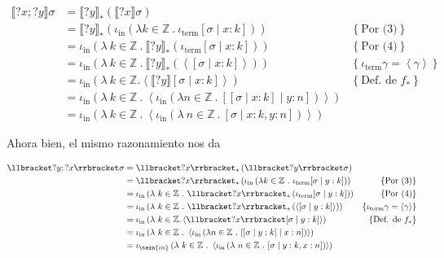 \documentclass[a4paper, 12pt]{article}
\begin{document}
\begin{align*}
  \llbracket ?x;?y \rrbracket\sigma 
  &= \llbracket ?y \rrbracket_* \left( \llbracket ?x \rrbracket \sigma \right)
  \\ 
  &=\llbracket ?y \rrbracket_* \left( \iota_{\text{in}}\left( \lambda k \in
\mathbb{Z} ~.~ \iota_{\text{term}}[\sigma \mid x : k] \right)  \right) &\left\{
\text{Por (3)}\right\}  \\ 
  &=\iota_{\text{in}} \left( \lambda ~ k \in \mathbb{Z} ~.~ \llbracket ?y
\rrbracket_*\left( \iota_{\text{term}} [\sigma \mid x : k] \right) \right)
  &\left\{ \text{Por (4)} \right\} \\ 
  &=\iota_{\text{in}} \left( \lambda ~ k \in \mathbb{Z} ~.~ \llbracket ?y
\rrbracket_* \left( \left< [\sigma \mid x : k] \right> \right) \right) &\left\{
\iota_{\text{term}}\gamma = \left<\gamma \right>\right\} \\ 
  &=\iota_{\text{in}} \left( \lambda ~ k \in \mathbb{Z}. 
\left<\llbracket ?y \rrbracket[\sigma \mid x : k] \right>\right) &\left\{
\text{Def. de } f_* \right\}  \\ 
&=\iota_{\text{in}} \left( \lambda ~ k \in \mathbb{Z} ~.~ 
  \left< \iota_{\text{in}} \left(\lambda n \in
\mathbb{Z} ~.~ [[\sigma \mid x : k] \mid y : n] \right)\right> \right) \\ 
&=\iota_{\text{in}} \left( \lambda ~ k \in \mathbb{Z} ~.~ 
\left< \iota_\text{in} \left( \lambda ~ n \in \mathbb{Z} ~.~ [\sigma \mid x : k,
y : n] \right)  \right>\right) 
\end{align*}

Ahora bien, el mismo razonamiento nos da

\begin{align*}
  \llbracket ?y;?x \rrbracket\sigma 
  &= \llbracket ?x \rrbracket_* \left( \llbracket ?y \rrbracket \sigma \right)
  \\ 
  &=\llbracket ?x \rrbracket_* \left( \iota_{\text{in}}\left( \lambda k \in
\mathbb{Z} ~.~ \iota_{\text{term}}[\sigma \mid y : k] \right)  \right) &\left\{
\text{Por (3)}\right\}  \\ 
  &=\iota_{\text{in}} \left( \lambda ~ k \in \mathbb{Z} ~.~ \llbracket ?x
\rrbracket_*\left( \iota_{\text{term}} [\sigma \mid y : k] \right) \right)
  &\left\{ \text{Por (4)} \right\} \\ 
  &=\iota_{\text{in}} \left( \lambda ~ k \in \mathbb{Z} ~.~ \llbracket ?x
\rrbracket_* \left( \left< [\sigma \mid y : k] \right> \right) \right) &\left\{
\iota_{\text{term}}\gamma = \left<\gamma \right>\right\} \\ 
  &=\iota_{\text{in}} \left( \lambda ~ k \in \mathbb{Z}. 
\left<\llbracket ?x \rrbracket[\sigma \mid y : k] \right>\right) &\left\{
\text{Def. de } f_* \right\}  \\ 
&=\iota_{\text{in}} \left( \lambda ~ k \in \mathbb{Z} ~.~ 
  \left< \iota_{\text{in}} \left(\lambda n \in
\mathbb{Z} ~.~ [[\sigma \mid y : k] \mid x : n] \right)\right> \right) \\ 
&=\iota_{\texn{in}} \left( \lambda ~ k \in \mathbb{Z} ~.~ 
\left< \iota_\text{in} \left( \lambda ~ n \in \mathbb{Z} ~.~ [\sigma \mid y : k,
x : n] \right)  \right>\right) 
\end{align*}
\end{document}
